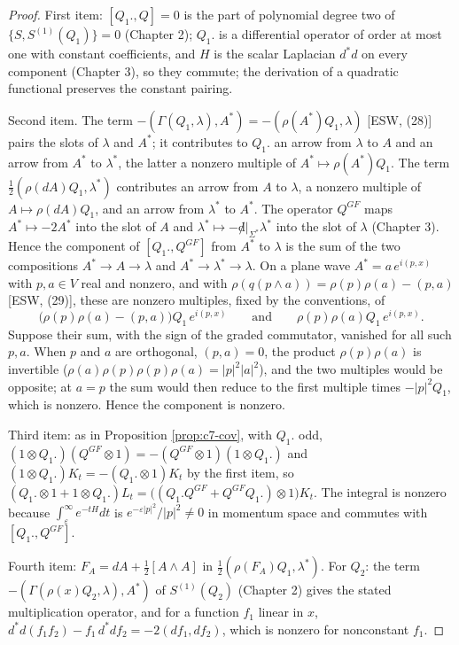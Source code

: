 \begin{proof}
First item: $[Q_1.,Q]=0$ is the part of polynomial degree two of $\{S,S^{(1)}(Q_1)\}=0$ (Chapter 2); $Q_1.$ is a differential operator of order at most one with constant coefficients, and $H$ is the scalar Laplacian $d^*d$ on every component (Chapter 3), so they commute; the derivation of a quadratic functional preserves the constant pairing.

Second item. The term $-(\Gamma(Q_1,\lambda),A^*)=-(\rho(A^*)Q_1,\lambda)$ [ESW, (28)] pairs the slots of $\lambda$ and $A^*$; it contributes to $Q_1.$ an arrow from $\lambda$ to $A$ and an arrow from $A^*$ to $\lambda^*$, the latter a nonzero multiple of $A^*\mapsto\rho(A^*)Q_1$. The term $\tfrac12(\rho(dA)Q_1,\lambda^*)$ contributes an arrow from $A$ to $\lambda$, a nonzero multiple of $A\mapsto\rho(dA)Q_1$, and an arrow from $\lambda^*$ to $A^*$. The operator $Q^{GF}$ maps $A^*\mapsto-2A^*$ into the slot of $A$ and $\lambda^*\mapsto-{\not d}|_{\Sigma^*}\lambda^*$ into the slot of $\lambda$ (Chapter 3). Hence the component of $[Q_1.,Q^{GF}]$ from $A^*$ to $\lambda$ is the sum of the two compositions $A^*\to A\to\lambda$ and $A^*\to\lambda^*\to\lambda$. On a plane wave $A^*=a\,e^{i(p,x)}$ with $p,a\in V$ real and nonzero, and with $\rho(q(p\wedge a))=\rho(p)\rho(a)-(p,a)$ [ESW, (29)], these are nonzero multiples, fixed by the conventions, of
\[
\big(\rho(p)\rho(a)-(p,a)\big)Q_1\,e^{i(p,x)}\qquad\text{and}\qquad \rho(p)\rho(a)Q_1\,e^{i(p,x)} .
\]
Suppose their sum, with the sign of the graded commutator, vanished for all such $p,a$. When $p$ and $a$ are orthogonal, $(p,a)=0$, the product $\rho(p)\rho(a)$ is invertible ($\rho(a)\rho(p)\rho(p)\rho(a)=|p|^2|a|^2$), and the two multiples would be opposite; at $a=p$ the sum would then reduce to the first multiple times $-|p|^2Q_1$, which is nonzero. Hence the component is nonzero.

Third item: as in Proposition \ref{prop:c7-cov}, with $Q_1.$ odd, $(1\otimes Q_1.)(Q^{GF}\otimes1)=-(Q^{GF}\otimes1)(1\otimes Q_1.)$ and $(1\otimes Q_1.)K_t=-(Q_1.\otimes1)K_t$ by the first item, so $(Q_1.\otimes1+1\otimes Q_1.)L_t=\big((Q_1.Q^{GF}+Q^{GF}Q_1.)\otimes1\big)K_t$. The integral is nonzero because $\int_\varepsilon^\infty e^{-tH}dt$ is $e^{-\varepsilon|p|^2}/|p|^2\neq0$ in momentum space and commutes with $[Q_1.,Q^{GF}]$.

Fourth item: $F_A=dA+\tfrac12[A\wedge A]$ in $\tfrac12(\rho(F_A)Q_1,\lambda^*)$. For $Q_2$: the term $-(\Gamma(\rho(x)Q_2,\lambda),A^*)$ of $S^{(1)}(Q_2)$ (Chapter 2) gives the stated multiplication operator, and for a function $f_1$ linear in $x$, $d^*d(f_1f_2)-f_1\,d^*df_2=-2(df_1,df_2)$, which is nonzero for nonconstant $f_1$.
\end{proof}

